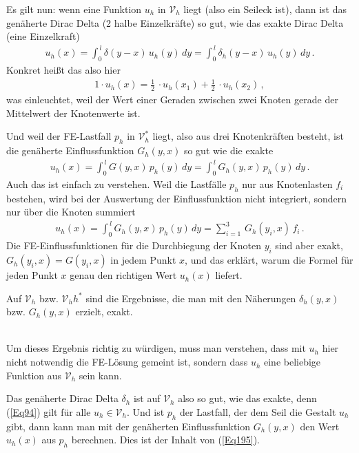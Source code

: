 {Es gilt nun: wenn eine Funktion $u_h $ in $\mathcal{V}_h $ liegt (also ein Seileck ist), dann ist das gen\"{a}herte Dirac Delta (2 halbe Einzelkr\"{a}fte) so gut, wie  das exakte Dirac Delta (eine Einzelkraft)
\begin{align}\label{Eq94}
u_h(x) = \int_0^{\,l} \delta(y-x)\,u_h(y)\,dy = \int_0^{\,l} \delta_h(y-x)\,u_h(y)\,dy\,.
\end{align}
Konkret hei{\ss}t das also hier
\begin{align}
1 \cdot u_h(x) = \frac{1}{2}\, \cdot u_h(x_1) + \frac{1}{2}\, \cdot u_h(x_2)\,,
\end{align}
was einleuchtet, weil der Wert einer Geraden zwischen zwei Knoten gerade der Mittelwert der Knotenwerte ist.

Und weil der FE-Lastfall $p_h$ in $\mathcal{V}_h^*$ liegt, also aus drei Knotenkr\"{a}ften besteht, ist die gen\"{a}herte Einflussfunktion $G_h(y,x)$ so gut wie die exakte
\begin{align}
u_h(x) = \int_0^{\,l} G(y,x)\,p_h(y)\,dy = \int_0^{\,l} G_h(y,x)\,p_h(y)\,dy\,.
\end{align}
Auch das ist einfach zu verstehen. Weil die Lastf\"{a}lle $p_h$ nur aus Knotenlasten $f_i$ bestehen, wird bei der Auswertung der Einflussfunktion nicht integriert, sondern nur \"{u}ber die Knoten summiert
\begin{align}\label{Eq195}
u_h(x) = \int_0^{\,l} G_h(y,x)\,p_h(y)\,dy = \sum_{i = 1}^3\,G_h(y_i,x)\,f_i\,.
\end{align}
Die FE-Einflussfunktionen f\"{u}r die Durchbiegung der Knoten $y_i$ sind aber exakt, $G_h(y_i,x) = G(y_i,x)$ in jedem Punkt $x$, und das erkl\"{a}rt, warum die Formel f\"{u}r jeden Punkt $x$ genau den richtigen Wert $u_h(x)$ liefert.\\


\hspace*{-12pt}\colorbox{highlightBlue}{\parbox{0.98\textwidth}{Auf $\mathcal{V}_h$ bzw. $\mathcal{V}_hh^*$ sind die Ergebnisse, die man mit den N\"{a}herungen $\delta_h(y,x)$ bzw. $G_h(y,x)$ erzielt, exakt.}}\\

Um dieses Ergebnis richtig zu w\"{u}rdigen, muss man verstehen, dass mit $u_h$ hier nicht notwendig die FE-L\"{o}sung gemeint ist, sondern dass $u_h$ eine beliebige Funktion aus $\mathcal{V}_h$ sein kann.

Das gen\"{a}herte Dirac Delta $\delta_h$ ist auf $\mathcal{V}_h$ also so gut, wie das exakte, denn (\ref{Eq94}) gilt f\"{u}r alle $u_h \in \mathcal{V}_h$. Und ist $p_h$ der Lastfall, der dem Seil die Gestalt $u_h$ gibt, dann kann man mit der gen\"{a}herten Einflussfunktion $G_h(y,x)$ den Wert $u_h(x)$ aus $p_h$ berechnen. Dies ist der Inhalt von (\ref{Eq195}).


}
